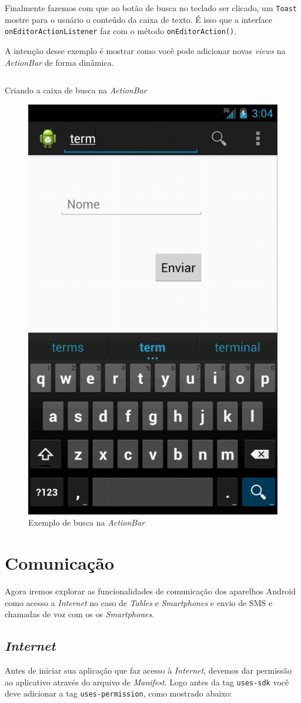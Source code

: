 \documentclass[a4paper,12pt,brazil]{book}
\begin{document}
\begin{singlespace}
		Finalmente fazemos com que ao botão de busca no teclado ser clicado, um \texttt{Toast} mostre para o usuário o conteúdo da caixa de texto. É isso que a interface \texttt{onEditorActionListener} faz com o método \texttt{onEditorAction()}.
		
		A intenção desse exemplo é mostrar como você pode adicionar novas \emph{views} na \emph{ActionBar} de forma dinâmica.
		 
		\begin{listing}[H]
		\inputminted[linenos=true,fontsize=\small,frame=lines, framesep=2mm, tabsize=2,numbersep=5pt]{java}{src/design/actionbar-acao.java}
		\caption{Criando a caixa de busca na \emph{ActionBar}}
		\label{code:actionbar-seach}
		\end{listing}
		
		
	\begin{figure}[H]
	  \centering
	  \includegraphics[width=.3\textwidth]{figuras/design/actionbar-search.png}
	  \caption{Exemplo de busca na \emph{ActionBar}}
	  \label{fig:e}
	\end{figure}


\chapter{Comunicação}

	Agora iremos explorar as funcionalidades de comunicação dos aparelhos Android como acesso a \emph{Internet} no caso de \emph{Tables} e \emph{Smartphones} e envio de SMS e chamadas de voz com os os \emph{Smartphones}. 

\section{\emph{Internet}}

	Antes de iniciar sua aplicação que faz acesso à \emph{Internet}, devemos dar permissão ao aplicativo através do arquivo de \emph{Manifest}. Logo antes da tag \texttt{uses-sdk} você deve adicionar a tag \texttt{uses-permission}, como mostrado abaixo:


\end{singlespace}
\end{document}
